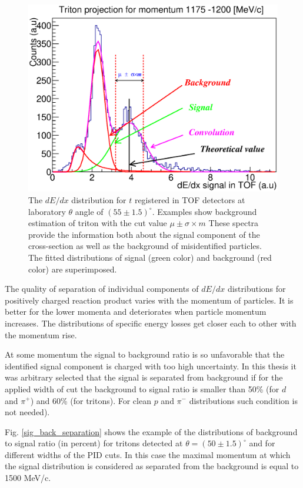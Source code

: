 \begin{figure}[!ht]
    \centering
    \includegraphics[width=\textwidth]{images/triton2.eps}
    \caption{The $dE/dx$ distribution for  $t$  registered in TOF detectors 
                at laboratory $\theta$ angle of $(55\pm1.5)^{\circ}$. Examples show background estimation of triton with the cut value $\mu \pm \sigma \times m$
                These spectra provide the information both about the signal component of the cross-section as well as the background of misidentified particles. The fitted distributions of signal (green color) and 
                background (red color) are superimposed.}
    \label{Triton_background}
\end{figure}



The quality of separation of individual components of $dE/dx$ distributions for positively charged reaction product 
varies with the momentum of particles. It is better for the lower momenta and deteriorates when particle momentum  increases.
The distributions of specific energy losses get closer each to other with the momentum rise.

At some momentum the signal to background ratio is so unfavorable that the identified 
signal component is charged with too high uncertainty.
In this thesis it was arbitrary selected that the signal is separated from background 
if for the applied width of cut the background to signal ratio is smaller than 50\% (for $d$ and $\pi^{+}$) and 60\% (for tritons). For clean $p$ and  $\pi^{-}$ distributions such condition is not needed).

Fig. \ref{sig_back_separation} shows the example of the distributions of background to signal ratio (in percent) for tritons detected at $\theta=(50\pm1.5)^{\circ}$ and for different widths of the PID  cuts. 
In this case the maximal momentum at which the signal distribution is considered as  separated from the background is equal to 1500 MeV/c.

